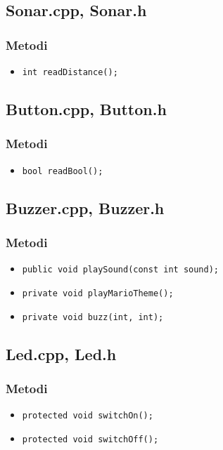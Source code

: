 \subsection{Sonar.cpp, Sonar.h}
\subsubsection{Metodi}
\begin{itemize}
	\item \texttt{int readDistance();}
\end{itemize}

\subsection{Button.cpp, Button.h}
\subsubsection{Metodi}
\begin{itemize}
	\item \texttt{bool readBool();}
\end{itemize}

\subsection{Buzzer.cpp, Buzzer.h}
\subsubsection{Metodi}
\begin{itemize}
	\item \texttt{public void playSound(const int sound);}
	\item \texttt{private void playMarioTheme();}
	\item \texttt{private void buzz(int, int);}
\end{itemize}

\subsection{Led.cpp, Led.h}
\subsubsection{Metodi}
\begin{itemize}
	\item \texttt{protected	void switchOn();}
	\item \texttt{protected	void switchOff();}
\end{itemize}

